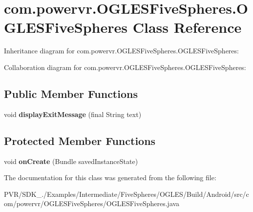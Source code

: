 \hypertarget{classcom_1_1powervr_1_1_o_g_l_e_s_five_spheres_1_1_o_g_l_e_s_five_spheres}{\section{com.\+powervr.\+O\+G\+L\+E\+S\+Five\+Spheres.\+O\+G\+L\+E\+S\+Five\+Spheres Class Reference}
\label{classcom_1_1powervr_1_1_o_g_l_e_s_five_spheres_1_1_o_g_l_e_s_five_spheres}
}


Inheritance diagram for com.\+powervr.\+O\+G\+L\+E\+S\+Five\+Spheres.\+O\+G\+L\+E\+S\+Five\+Spheres\+:


Collaboration diagram for com.\+powervr.\+O\+G\+L\+E\+S\+Five\+Spheres.\+O\+G\+L\+E\+S\+Five\+Spheres\+:
\subsection*{Public Member Functions}
\begin{DoxyCompactItemize}
\item 
\hypertarget{classcom_1_1powervr_1_1_o_g_l_e_s_five_spheres_1_1_o_g_l_e_s_five_spheres_a9dece8c63d9d41dd5a4ebbae495275bb}{void {\bfseries display\+Exit\+Message} (final String text)}\label{classcom_1_1powervr_1_1_o_g_l_e_s_five_spheres_1_1_o_g_l_e_s_five_spheres_a9dece8c63d9d41dd5a4ebbae495275bb}

\end{DoxyCompactItemize}
\subsection*{Protected Member Functions}
\begin{DoxyCompactItemize}
\item 
\hypertarget{classcom_1_1powervr_1_1_o_g_l_e_s_five_spheres_1_1_o_g_l_e_s_five_spheres_ac232f4f9078f4ce72c8547c36b6c5362}{void {\bfseries on\+Create} (Bundle saved\+Instance\+State)}\label{classcom_1_1powervr_1_1_o_g_l_e_s_five_spheres_1_1_o_g_l_e_s_five_spheres_ac232f4f9078f4ce72c8547c36b6c5362}

\end{DoxyCompactItemize}


The documentation for this class was generated from the following file\+:\begin{DoxyCompactItemize}
\item 
P\+V\+R/\+S\+D\+K\+\_./\+Examples/\+Intermediate/\+Five\+Spheres/\+O\+G\+L\+E\+S/\+Build/\+Android/src/com/powervr/\+O\+G\+L\+E\+S\+Five\+Spheres/O\+G\+L\+E\+S\+Five\+Spheres.\+java\end{DoxyCompactItemize}

